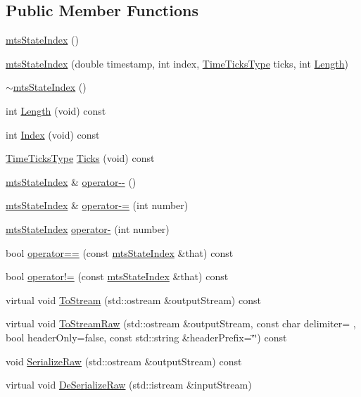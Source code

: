 \subsection*{Public Member Functions}
\begin{DoxyCompactItemize}
\item 
\hyperlink{classmts_state_index_aef0bef10b969db03fa40817c316227f5}{mts\+State\+Index} ()
\item 
\hyperlink{classmts_state_index_a03e7f263594442b60da5bab69406c3fa}{mts\+State\+Index} (double timestamp, int index, \hyperlink{classmts_state_index_a80d0a5acdec3b616347ddea2912b6294}{Time\+Ticks\+Type} ticks, int \hyperlink{classmts_state_index_a7edfd9644598e469b2a4e6161b15d9b6}{Length})
\item 
\hyperlink{classmts_state_index_afb7ff083d182f2dba64dc183292ddfd2}{$\sim$mts\+State\+Index} ()
\item 
int \hyperlink{classmts_state_index_a7edfd9644598e469b2a4e6161b15d9b6}{Length} (void) const 
\item 
int \hyperlink{classmts_state_index_ac117e13b981b49408776af1b53dfa09c}{Index} (void) const 
\item 
\hyperlink{classmts_state_index_a80d0a5acdec3b616347ddea2912b6294}{Time\+Ticks\+Type} \hyperlink{classmts_state_index_af3cc32958c37bae9e7d658b9a94655e2}{Ticks} (void) const 
\item 
\hyperlink{classmts_state_index}{mts\+State\+Index} \& \hyperlink{classmts_state_index_adf83691b3fc4a5676685ce24192549f4}{operator-\/-\/} ()
\item 
\hyperlink{classmts_state_index}{mts\+State\+Index} \& \hyperlink{classmts_state_index_a1d41bc34a81a7b327f0e861e8a94a382}{operator-\/=} (int number)
\item 
\hyperlink{classmts_state_index}{mts\+State\+Index} \hyperlink{classmts_state_index_abff1cc39caae8dd968f73ad546cf5095}{operator-\/} (int number)
\item 
bool \hyperlink{classmts_state_index_a7adcfadae2d8422c6f585b82fd5ca084}{operator==} (const \hyperlink{classmts_state_index}{mts\+State\+Index} \&that) const 
\item 
bool \hyperlink{classmts_state_index_aaec271010e78d34917aab1674216ade5}{operator!=} (const \hyperlink{classmts_state_index}{mts\+State\+Index} \&that) const 
\item 
virtual void \hyperlink{classmts_state_index_a3e16f00c85016723e04052e03a2547ec}{To\+Stream} (std\+::ostream \&output\+Stream) const 
\item 
virtual void \hyperlink{classmts_state_index_adbe9ecadbcdf1321b8c6c37235490def}{To\+Stream\+Raw} (std\+::ostream \&output\+Stream, const char delimiter= \textquotesingle{} \textquotesingle{}, bool header\+Only=false, const std\+::string \&header\+Prefix=\char`\"{}\char`\"{}) const 
\item 
void \hyperlink{classmts_state_index_a805bdf14ee35773a9b1212599ba959c8}{Serialize\+Raw} (std\+::ostream \&output\+Stream) const 
\item 
virtual void \hyperlink{classmts_state_index_a431ca694480fa7568b5384187d139402}{De\+Serialize\+Raw} (std\+::istream \&input\+Stream)
\end{DoxyCompactItemize}


